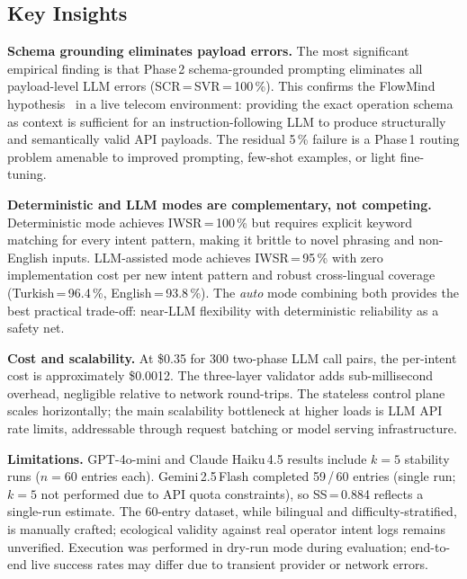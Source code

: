 \documentclass[conference]{IEEEtran}
\begin{document}
\subsection{Key Insights}

\textbf{Schema grounding eliminates payload errors.}
The most significant empirical finding is that Phase\,2 schema-grounded
prompting eliminates all payload-level LLM errors (SCR\,=\,SVR\,=\,100\,\%).
This confirms the FlowMind hypothesis~\cite{flowmind2023} in a live
telecom environment: providing the exact operation schema as context
is sufficient for an instruction-following LLM to produce structurally
and semantically valid API payloads.
The residual 5\,\% failure is a Phase\,1 routing problem amenable to
improved prompting, few-shot examples, or light fine-tuning.

\textbf{Deterministic and LLM modes are complementary, not competing.}
Deterministic mode achieves IWSR\,=\,100\,\% but requires explicit
keyword matching for every intent pattern, making it brittle to novel
phrasing and non-English inputs.
LLM-assisted mode achieves IWSR\,=\,95\,\% with zero implementation
cost per new intent pattern and robust cross-lingual coverage
(Turkish\,=\,96.4\,\%, English\,=\,93.8\,\%).
The \textit{auto} mode combining both provides the best practical
trade-off: near-LLM flexibility with deterministic reliability as
a safety net.

\textbf{Cost and scalability.}
At \$0.35 for 300 two-phase LLM call pairs, the per-intent cost is
approximately \$0.0012.
The three-layer validator adds sub-millisecond overhead, negligible
relative to network round-trips.
The stateless control plane scales horizontally; the main
scalability bottleneck at higher loads is LLM API rate limits,
addressable through request batching or model serving infrastructure.

\textbf{Limitations.}
GPT-4o-mini and Claude Haiku\,4.5 results include $k=5$ stability runs
($n=60$ entries each). Gemini\,2.5\,Flash completed 59\,/\,60 entries
(single run; $k=5$ not performed due to API quota constraints),
so SS\,=\,0.884 reflects a single-run estimate.
The 60-entry dataset, while bilingual and difficulty-stratified,
is manually crafted; ecological validity against real operator intent
logs remains unverified.
Execution was performed in dry-run mode during evaluation; end-to-end
live success rates may differ due to transient provider or network errors.

\end{document}
